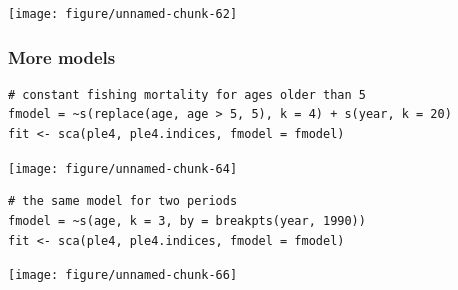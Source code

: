 \documentclass[a4paper,english,10pt]{article}\usepackage[]{graphicx}\usepackage[]{color}
\makeatletter
\newenvironment{kframe}{%
 \def\at@end@of@kframe{}%
 \ifinner\ifhmode%
  \def\at@end@of@kframe{\end{minipage}}%
  \begin{minipage}{\columnwidth}%
 \fi\fi%
 \def\FrameCommand##1{\hskip\@totalleftmargin \hskip-\fboxsep
 \colorbox{shadecolor}{##1}\hskip-\fboxsep
     \hskip-\linewidth \hskip-\@totalleftmargin \hskip\columnwidth}%
 \MakeFramed {\advance\hsize-\width
   \@totalleftmargin\z@ \linewidth\hsize
   \@setminipage}}%
 {\par\unskip\endMakeFramed%
 \at@end@of@kframe}
\newenvironment{knitrout}{}{} %
\makeatother
\begin{document}
\begin{knitrout}
\color{fgcolor}

{\centering \texttt{[image: figure/unnamed-chunk-62]} 

}



\end{knitrout}


\subsubsection{More models}

\begin{knitrout}
\color{fgcolor}\begin{kframe}
\begin{verbatim}
# constant fishing mortality for ages older than 5
fmodel = ~s(replace(age, age > 5, 5), k = 4) + s(year, k = 20)
fit <- sca(ple4, ple4.indices, fmodel = fmodel)
\end{verbatim}
\end{kframe}
\end{knitrout}


\begin{knitrout}
\color{fgcolor}

{\centering \texttt{[image: figure/unnamed-chunk-64]} 

}



\end{knitrout}


\begin{knitrout}
\color{fgcolor}\begin{kframe}
\begin{verbatim}
# the same model for two periods
fmodel = ~s(age, k = 3, by = breakpts(year, 1990))
fit <- sca(ple4, ple4.indices, fmodel = fmodel)
\end{verbatim}
\end{kframe}
\end{knitrout}


\begin{knitrout}
\color{fgcolor}

{\centering \texttt{[image: figure/unnamed-chunk-66]} 

}



\end{knitrout}
\end{document}
